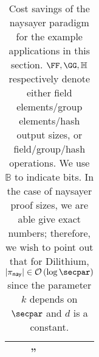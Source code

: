 \begin{table}[tb]
{\begin{tabular}{l c c c c}
     & ''  \\
    \bottomrule
    \end{tabular}
    }
    \caption{Cost savings of the naysayer paradigm for the example applications in this section. $\FF,\GG,\mathbb{H}$ respectively denote either field elements/group elements/hash output sizes, or field/group/hash operations. We use $\mathbb{B}$ to indicate bits. In the case of naysayer proof sizes, we are able give exact numbers; therefore, we wish to point out that for Dilithium, $\sizeof{\pi_\nay} \in \bigO{\log{\secpar}}$ since the parameter $k$ depends on $\secpar$ and $d$ is a constant. }
    \label{tab:apps_table}
   \end{table}
   